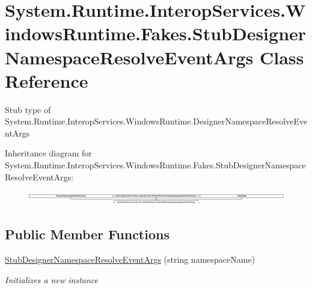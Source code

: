 \hypertarget{class_system_1_1_runtime_1_1_interop_services_1_1_windows_runtime_1_1_fakes_1_1_stub_designer_namespace_resolve_event_args}{\section{System.\-Runtime.\-Interop\-Services.\-Windows\-Runtime.\-Fakes.\-Stub\-Designer\-Namespace\-Resolve\-Event\-Args Class Reference}
\label{class_system_1_1_runtime_1_1_interop_services_1_1_windows_runtime_1_1_fakes_1_1_stub_designer_namespace_resolve_event_args}
}


Stub type of System.\-Runtime.\-Interop\-Services.\-Windows\-Runtime.\-Designer\-Namespace\-Resolve\-Event\-Args 


Inheritance diagram for System.\-Runtime.\-Interop\-Services.\-Windows\-Runtime.\-Fakes.\-Stub\-Designer\-Namespace\-Resolve\-Event\-Args\-:\begin{figure}[H]
\begin{center}
\leavevmode
\includegraphics[height=0.608035cm]{class_system_1_1_runtime_1_1_interop_services_1_1_windows_runtime_1_1_fakes_1_1_stub_designer_namespace_resolve_event_args}
\end{center}
\end{figure}
\subsection*{Public Member Functions}
\begin{DoxyCompactItemize}
\item 
\hyperlink{class_system_1_1_runtime_1_1_interop_services_1_1_windows_runtime_1_1_fakes_1_1_stub_designer_namespace_resolve_event_args_a2bd6ad49c18cfb2dfc7610c80a701606}{Stub\-Designer\-Namespace\-Resolve\-Event\-Args} (string namespace\-Name)
\begin{DoxyCompactList}\small\item\em Initializes a new instance\end{DoxyCompactList}\end{DoxyCompactItemize}
